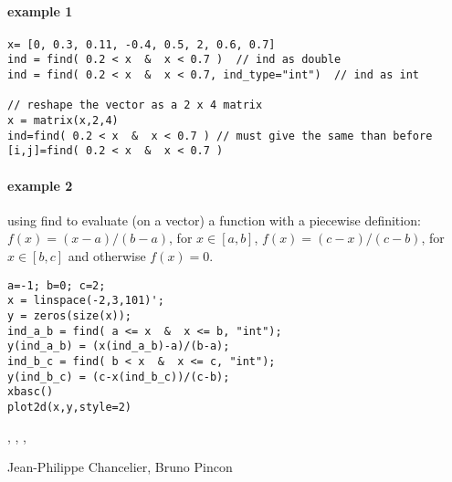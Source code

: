 \begin{examples}
  
\paragraph{example 1}
\begin{Verbatim}
x= [0, 0.3, 0.11, -0.4, 0.5, 2, 0.6, 0.7]
ind = find( 0.2 < x  &  x < 0.7 )  // ind as double
ind = find( 0.2 < x  &  x < 0.7, ind_type="int")  // ind as int

// reshape the vector as a 2 x 4 matrix
x = matrix(x,2,4)
ind=find( 0.2 < x  &  x < 0.7 ) // must give the same than before 
[i,j]=find( 0.2 < x  &  x < 0.7 )
\end{Verbatim}
  
\paragraph{example 2} using find to evaluate (on a vector) a function with a
piecewise definition: $f(x) = (x-a)/(b-a)$, for  $x \in
[a,b]$, $f(x) = (c-x)/(c-b)$, for $x \in [b,c]$ and otherwise $f(x) = 0$. 
\begin{Verbatim}
a=-1; b=0; c=2;
x = linspace(-2,3,101)';
y = zeros(size(x));
ind_a_b = find( a <= x  &  x <= b, "int");
y(ind_a_b) = (x(ind_a_b)-a)/(b-a);
ind_b_c = find( b < x  &  x <= c, "int");
y(ind_b_c) = (c-x(ind_b_c))/(c-b);
xbasc()
plot2d(x,y,style=2)
\end{Verbatim}
  
\end{examples}

\begin{manseealso}
 , , ,   
\end{manseealso}

\begin{authors}
  Jean-Philippe Chancelier, Bruno Pincon
\end{authors}
